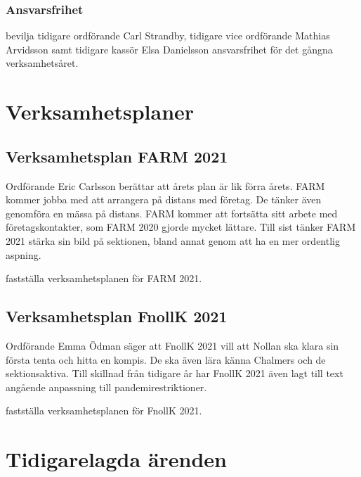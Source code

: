 \documentclass[hidelinks]{sektionsmote}
\begin{document}
\subsubsection{Ansvarsfrihet}
\begin{beslut}
  \item bevilja tidigare ordförande Carl Strandby, tidigare vice ordförande Mathias Arvidsson samt tidigare kassör Elsa Danielsson ansvarsfrihet för det gångna verksamhetsåret.
\end{beslut}


\section{Verksamhetsplaner}
\subsection{Verksamhetsplan FARM 2021}
Ordförande Eric Carlsson berättar att årets plan är lik förra årets.
FARM kommer jobba med att arrangera på distans med företag.
De tänker även genomföra en mässa på distans.
FARM kommer att fortsätta sitt arbete med företagskontakter, som FARM 2020 gjorde mycket lättare.
Till sist tänker FARM 2021 stärka sin bild på sektionen, bland annat genom att ha en mer ordentlig aspning.

\begin{beslut}
  \item fastställa verksamhetsplanen för FARM 2021.%
\end{beslut}


\subsection{Verksamhetsplan FnollK 2021}
Ordförande Emma Ödman säger att FnollK 2021 vill att Nollan ska klara sin första tenta och hitta en kompis.
De ska även lära känna Chalmers och de sektionsaktiva.
Till skillnad från tidigare år har FnollK 2021 även lagt till text angående anpassning till pandemirestriktioner.

\begin{beslut}
  \item fastställa verksamhetsplanen för FnollK 2021.
\end{beslut}


\section{Tidigarelagda ärenden}
\end{document}
